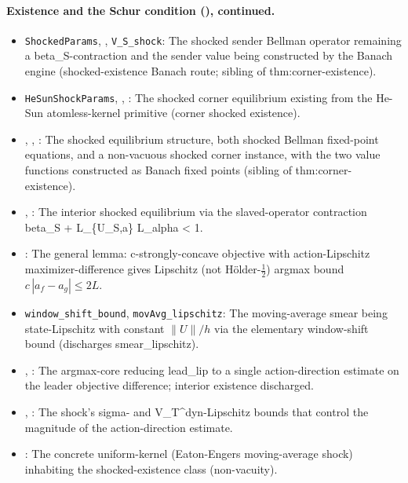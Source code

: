 \paragraph{Existence and the Schur condition (), continued.}
\begin{itemize}[leftmargin=1.4em,itemsep=1pt]
\item \texttt{ShockedParams}, , \texttt{V\_S\_shock}: The shocked sender Bellman operator remaining a beta\_S-contraction and the sender value being constructed by the Banach engine (shocked-existence Banach route; sibling of thm:corner-existence).
\item \texttt{HeSunShockParams}, , : The shocked corner equilibrium existing from the He-Sun atomless-kernel primitive (corner shocked existence).
\item {}, , : The shocked equilibrium structure, both shocked Bellman fixed-point equations, and a non-vacuous shocked corner instance, with the two value functions constructed as Banach fixed points (sibling of thm:corner-existence).
\item {}, : The interior shocked equilibrium via the slaved-operator contraction beta\_S + L\_\{U\_S,a\} L\_alpha \textless{} 1.
\item {}: The general lemma: c-strongly-concave objective with action-Lipschitz maximizer-difference gives Lipschitz (not Hölder-$\tfrac12$) argmax bound $c\,|a_f-a_g|\le 2L$.
\item \texttt{window\_shift\_bound}, \texttt{movAvg\_lipschitz}: The moving-average smear being state-Lipschitz with constant $\|U\|/h$ via the elementary window-shift bound (discharges smear\_lipschitz).
\item {}, : The argmax-core reducing lead\_lip to a single action-direction estimate on the leader objective difference; interior existence discharged.
\item {}, : The shock's sigma- and V\_T\textasciicircum{}dyn-Lipschitz bounds that control the magnitude of the action-direction estimate.
\item {}: The concrete uniform-kernel (Eaton-Engers moving-average shock) inhabiting the shocked-existence class (non-vacuity).

\end{itemize}
